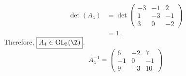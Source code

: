 \documentclass[
  coursecode={MTHE 418},
  assignmentname={Homework \homeworknumber},
  studentnumber=20053722,
  name={Bryan Hoang},
  draft,
]{
  ltxanswer%
}
\begin{document}
\begin{questions}
\begin{parts}
      \part{}
      \begin{solution}
        \begin{align*}
          \det(A_{4}) &= \det\begin{pmatrix}-3&-1&2\\1&-3&-1\\3&0&-2\end{pmatrix} \\
                      &= 1.
        \end{align*}
        Therefore, \(\boxed{A_{4} \in \mathrm{GL}_{3}(\Z)}\).
        \begin{equation*}
          \boxed{A_{4}^{-1} = \begin{pmatrix}6&-2&7\\-1&0&-1\\9&-3&10\end{pmatrix}}
        \end{equation*}
      \end{solution}
    \end{parts}
  \end{questions}
\end{document}
